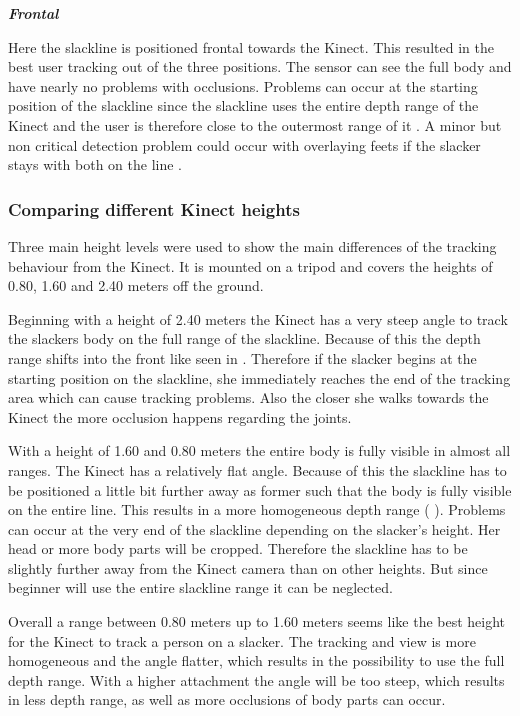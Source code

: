 \textit{\textbf{Frontal}}

Here the slackline is positioned frontal towards the Kinect. This resulted in the best user tracking out of the three positions. The sensor can see the full body and have nearly no problems with occlusions. Problems can occur at the starting position of the slackline since the slackline uses the entire depth range of the Kinect and the user is therefore close to the outermost range of it \textbf{}.  A minor but non critical detection problem could occur with overlaying feets if the slacker stays with both on the line \textbf{}.

\subsubsection{Comparing different Kinect heights}
Three main height levels were used to show the main differences of the tracking behaviour from the Kinect. It is mounted on a tripod and covers the heights of 0.80, 1.60 and 2.40 meters off the ground. 

Beginning with a height of 2.40 meters the Kinect has a very steep angle to track the slackers body on the full range of the slackline. Because of this the depth range shifts into the front like seen in \textbf{}. Therefore if the slacker begins at the starting position on the slackline, she immediately reaches the end of the tracking area which can cause tracking problems. Also the closer she walks towards the Kinect the more occlusion happens regarding the joints.

With a height of 1.60 and 0.80 meters the entire body is fully visible in almost all ranges. The Kinect has a relatively flat angle. Because of this the slackline has to be positioned a little bit further away as former such that the body is fully visible on the entire line. This results in a more homogeneous depth range ( \textbf{}). Problems can occur at the very end of the slackline depending on the slacker’s height. Her head or more body parts will be cropped. Therefore the slackline has to be slightly further away from the Kinect camera than on other heights. But since beginner will use the entire slackline range it can be neglected.

Overall a range between 0.80 meters up to 1.60 meters seems like the best height for the Kinect to track a person on a slacker. The tracking and view is more homogeneous and the angle flatter, which results in the possibility to use the full depth range. With a higher attachment the angle will be too steep, which results in less depth range, as well as more occlusions of body parts can occur.

